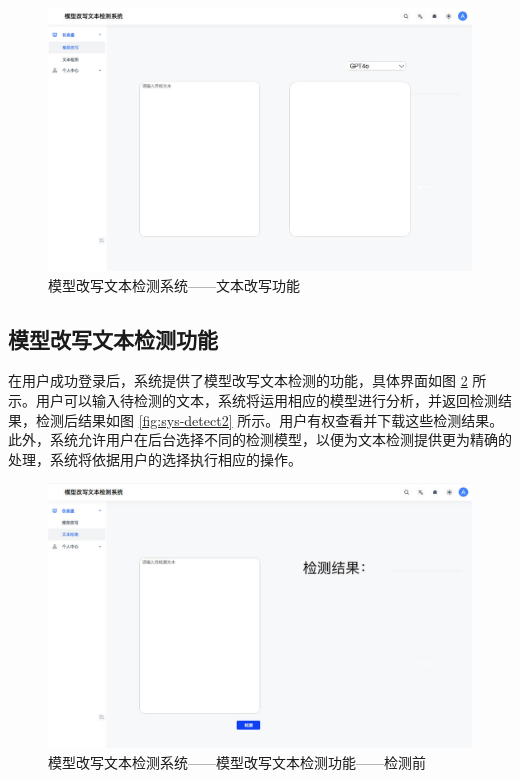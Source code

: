 \begin{figure}[htb]
    \centering
    \includegraphics[width=\textwidth]{figures/sys-polish.jpg}
    \caption{模型改写文本检测系统——文本改写功能}
    \label{fig:sys-polish}
\end{figure}

\subsection{模型改写文本检测功能}

在用户成功登录后，系统提供了模型改写文本检测的功能，具体界面如图 \ref{fig:sys-detect} 所示。用户可以输入待检测的文本，系统将运用相应的模型进行分析，并返回检测结果，检测后结果如图 \ref{fig:sys-detect2} 所示。用户有权查看并下载这些检测结果。此外，系统允许用户在后台选择不同的检测模型，以便为文本检测提供更为精确的处理，系统将依据用户的选择执行相应的操作。

\begin{figure}[htb]
    \centering
    \includegraphics[width=\textwidth]{figures/sys-detect.jpg}
    \caption{模型改写文本检测系统——模型改写文本检测功能——检测前}
    \label{fig:sys-detect}
\end{figure}

